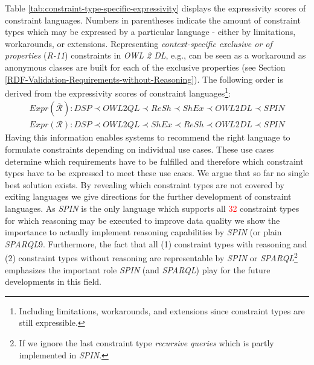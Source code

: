 \documentclass{acm_proc_article-sp}
\newcommand{\er}[1]{\todo[size=\small, color=red!40]{\textbf{Erman:} #1}}
\begin{document}
Table \ref{tab:constraint-type-specific-expressivity} displays the expressivity scores of constraint languages.
Numbers in parentheses indicate the amount of constraint types which may be expressed by a particular language - either by limitations, workarounds, or extensions.  
Representing {\em context-specific exclusive or of properties} (\emph{R-11}) constraints in \emph{OWL 2 DL}, e.g., can be seen as a workaround 
as anonymous classes are built for each of the exclusive properties (see Section \ref{RDF-Validation-Requirements-without-Reasoning}).
The following order is derived from the expressivity scores of constraint languages\footnote{Including limitations, workarounds, and extensions since constraint types are still expressible.}:
{\tiny
\begin{eqnarray*}
Expr(\overline{\mathcal{R}}): DSP \prec OWL2QL \prec ReSh \prec ShEx \prec OWL2DL \prec SPIN \\
Expr(\mathcal{R}): DSP \prec OWL2QL \prec ShEx \prec ReSh \prec OWL2DL \prec SPIN
\end{eqnarray*}
}%
Having this information enables systems to recommend the right language to formulate constraints depending on individual use cases.
These use cases determine which requirements have to be fulfilled and therefore which constraint types have to be expressed to meet these use cases.
We argue that so far no single best solution exists.
By revealing which constraint types are not covered by exiting languages 
we give directions for the further development of constraint languages.
As \emph{SPIN} is the only language which supports all \textcolor{red}{32} constraint types 
for which reasoning may be executed to improve data quality 
we show the importance to actually implement reasoning capabilities by \emph{SPIN} (or plain \emph{SPARQL}9.
Furthermore, the fact that all (1) constraint types with reasoning and (2) constraint types without reasoning are representable by \emph{SPIN} or \emph{SPARQL}\footnote{If we ignore the last constraint type \emph{recursive queries} which is partly implemented in \emph{SPIN}.} 
emphasizes the important role \emph{SPIN} (and \emph{SPARQL}) play for the future developments in this field.
\end{document}
